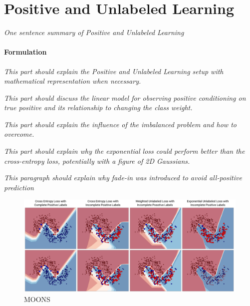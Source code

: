 \section{Positive and Unlabeled Learning}
\label{pulearning}

\textit{One sentence summary of Positive and Unlabeled Learning}


\paragraph{Formulation}

\textit{This part should explain the Positive and Unlabeled Learning setup with mathematical representation when necessary.}


\textit{This part should discuss the linear model for observing positive conditioning on true positive and its relationship to changing the class weight.}


\textit{This part should explain the influence of the imbalanced problem and how to overcome.}


\textit{This part should explain why the exponential loss could perform better than the cross-entropy loss, potentially with a figure of 2D Gaussians.}


\textit{This paragraph should explain why fade-in was introduced to avoid all-positive prediction}




\begin{figure}
\begin{center}
   \includegraphics[width=0.95\linewidth]{img/moons.png}
\end{center}
   \caption{MOONS}
\label{fig:moons}
\end{figure}


